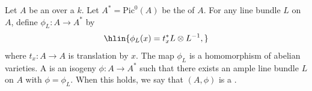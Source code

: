 \begin{definition} \label{definition:polarization_of_an_abelian_variety_over_a_field}
    Let $A$ be an  over a  $k$.
    Let $A^* = \mathrm{Pic}^0(A)$ be the  of $A$. For any line bundle $L$ on $A$, define $\phi_L\colon A \to A^*$ by
    $$\hlin{\phi_L(x) = t_x^* L \otimes L^{-1},}$$
    where $t_x\colon A \to A$ is translation by $x$. The map $\phi_L$ is a homomorphism of abelian varieties. A  is an isogeny $\phi\colon A \to A^*$ such that there exists an ample line bundle $L$ on $A$ with $\phi = \phi_L$. When this holds, we say that $(A, \phi)$ is a .
\end{definition}
